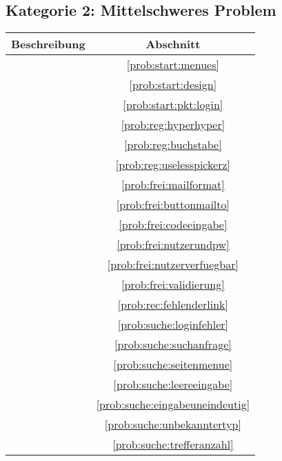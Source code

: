 \subsection*{Kategorie 2: Mittelschweres Problem}
\begin{tabular}{|p{12cm}|c|}
\hline
\textbf{Beschreibung} & \textbf{Abschnitt} \\
\hline\hline
\nameref{prob:start:menues} & \ref{prob:start:menues} \\
\nameref{prob:start:design} & \ref{prob:start:design} \\
\nameref{prob:start:pkt:login} & \ref{prob:start:pkt:login}\\
\nameref{prob:reg:hyperhyper} & \ref{prob:reg:hyperhyper}\\
\nameref{prob:reg:buchstabe} & \ref{prob:reg:buchstabe}\\
\nameref{prob:reg:uselesspickerz} & \ref{prob:reg:uselesspickerz}\\
\nameref{prob:frei:mailformat} & \ref{prob:frei:mailformat}\\
\nameref{prob:frei:buttonmailto} & \ref{prob:frei:buttonmailto}\\
\nameref{prob:frei:codeeingabe} & \ref{prob:frei:codeeingabe}\\
\nameref{prob:frei:nutzerundpw} & \ref{prob:frei:nutzerundpw}\\
\nameref{prob:frei:nutzerverfuegbar} & \ref{prob:frei:nutzerverfuegbar}\\
\nameref{prob:frei:validierung} & \ref{prob:frei:validierung}\\
\nameref{prob:rec:fehlenderlink} & \ref{prob:rec:fehlenderlink}\\
\nameref{prob:suche:loginfehler} & \ref{prob:suche:loginfehler}\\
\nameref{prob:suche:suchanfrage} & \ref{prob:suche:suchanfrage}\\
\nameref{prob:suche:seitenmenue} & \ref{prob:suche:seitenmenue}\\
\nameref{prob:suche:leereeingabe} & \ref{prob:suche:leereeingabe}\\
\nameref{prob:suche:eingabeuneindeutig} & \ref{prob:suche:eingabeuneindeutig}\\
\nameref{prob:suche:unbekanntertyp} & \ref{prob:suche:unbekanntertyp}\\
\nameref{prob:suche:trefferanzahl} & \ref{prob:suche:trefferanzahl}\\
\hline

\end{tabular}

